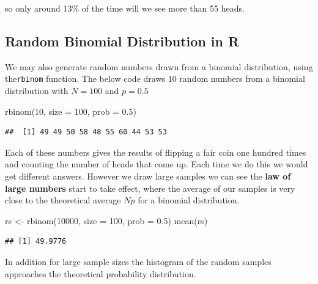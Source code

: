 \documentclass[
]{book}
\newenvironment{Shaded}{\begin{snugshade}}{\end{snugshade}}
\newcommand{\AttributeTok}[1]{\textcolor[rgb]{0.77,0.63,0.00}{#1}}
\newcommand{\DecValTok}[1]{\textcolor[rgb]{0.00,0.00,0.81}{#1}}
\newcommand{\FloatTok}[1]{\textcolor[rgb]{0.00,0.00,0.81}{#1}}
\newcommand{\FunctionTok}[1]{\textcolor[rgb]{0.00,0.00,0.00}{#1}}
\newcommand{\NormalTok}[1]{#1}
\newcommand{\OtherTok}[1]{\textcolor[rgb]{0.56,0.35,0.01}{#1}}
\theoremstyle{definition}
\theoremstyle{definition}
\theoremstyle{definition}
\theoremstyle{definition}
\theoremstyle{remark}
\begin{document}
so only around 13\% of the time will we see more than 55 heads.

\hypertarget{random-binomial-distribution-in-r}{%
\subsection{Random Binomial Distribution in R}\label{random-binomial-distribution-in-r}}

We may also generate random numbers drawn from a binomial distribution, using the\texttt{rbinom} function. The below code draws \(10\) random numbers from a binomial distribution with \(N=100\) and \(p=0.5\)

\begin{Shaded}
\begin{Highlighting}[]
\FunctionTok{rbinom}\NormalTok{(}\DecValTok{10}\NormalTok{, }\AttributeTok{size =} \DecValTok{100}\NormalTok{, }\AttributeTok{prob =} \FloatTok{0.5}\NormalTok{)}
\end{Highlighting}
\end{Shaded}

\begin{verbatim}
##  [1] 49 49 50 58 48 55 60 44 53 53
\end{verbatim}

Each of these numbers gives the results of flipping a fair coin one hundred times and counting the number of heads that come up. Each time we do this we would get different answers.
However we draw large samples we can see the \textbf{law of large numbers} start to take effect, where the average of our samples is very close to the theoretical average \(Np\) for a binomial distribution.

\begin{Shaded}
\begin{Highlighting}[]
\NormalTok{rs }\OtherTok{\textless{}{-}} \FunctionTok{rbinom}\NormalTok{(}\DecValTok{10000}\NormalTok{, }\AttributeTok{size =} \DecValTok{100}\NormalTok{, }\AttributeTok{prob =} \FloatTok{0.5}\NormalTok{)}
\FunctionTok{mean}\NormalTok{(rs)}
\end{Highlighting}
\end{Shaded}

\begin{verbatim}
## [1] 49.9776
\end{verbatim}

In addition for large sample sizes the histogram of the random samples approaches the theoretical probability distribution.
\end{document}
